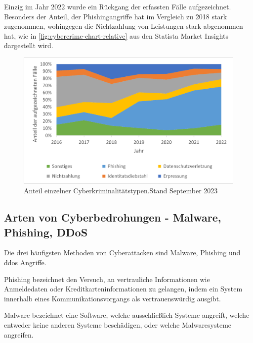 Einzig im Jahr 2022 wurde ein Rückgang der erfassten Fälle aufgezeichnet.
Besonders der Anteil, der Phishingangriffe hat im Vergleich zu 2018 stark zugenommen, wohingegen die Nichtzahlung von Leistungen stark abgenommen hat, wie in \autoref{fig:cybercrime-chart-relative} aus den Statista Market Insights\autocite[\vglf][]{statista-cybersecurity-cybercrime} dargestellt wird.

\begin{figure}[htpb]
    \centering
    \includegraphics[width = 0.75\linewidth, trim = {0.55cm 0.3cm 0.4cm 0.25cm}, clip]{src/abbildungen/Anteile_Cyberkriminalitaet}
    \captionsetup{width=\linewidth, format=hang}
    \caption[Anteil einzelner Cyberkriminalitätstypen]{Anteil einzelner Cyberkriminalitätstypen.\newline Stand September 2023}
    \label{fig:cybercrime-chart-relative}
\end{figure}

\subsection[Arten von Cyberbedrohungen]{Arten von Cyberbedrohungen - Malware, Phishing, DDoS}\label{subsec:arten-von-cyberbedrohungen---malware-phishing-ddos}

Die drei häufigsten Methoden von Cyberattacken sind Malware, Phishing und \gls{ddos} Angriffe.

\begin{definition}
    \label{def:phishing}
    Phishing bezeichnet den Versuch, an vertrauliche Informationen wie Anmeldedaten oder Kreditkarteninformationen zu gelangen, indem ein System innerhalb eines Kommunikationsvorgangs als vertrauenswürdig ausgibt.\autocite[\vglf][]{study-on-phishing-attacks:2018}
\end{definition}

\begin{definition}
    \label{def:malware}
    Malware bezeichnet eine Software, welche ausschließlich Systeme angreift, welche entweder keine anderen Systeme beschädigen, oder welche Malwaresysteme angreifen.\autocite[\vglf][\pagef 108f.]{definition-malware-2010}
\end{definition}

